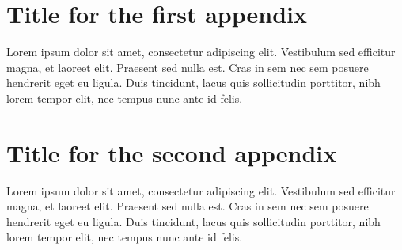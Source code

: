 
\chapter{Title for the first appendix}
\label{appendixA}

Lorem ipsum dolor sit amet, consectetur adipiscing elit. Vestibulum sed efficitur magna, et laoreet elit. Praesent sed nulla est. Cras in sem nec sem posuere hendrerit eget eu ligula. Duis tincidunt, lacus quis sollicitudin porttitor, nibh lorem tempor elit, nec tempus nunc ante id felis.


\cleardoublepage
\chapter{Title for the second appendix}
\label{appendixB}

Lorem ipsum dolor sit amet, consectetur adipiscing elit. Vestibulum sed efficitur magna, et laoreet elit. Praesent sed nulla est. Cras in sem nec sem posuere hendrerit eget eu ligula. Duis tincidunt, lacus quis sollicitudin porttitor, nibh lorem tempor elit, nec tempus nunc ante id felis.

